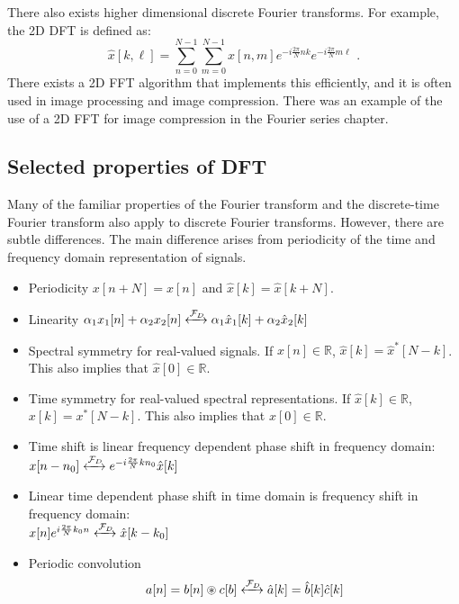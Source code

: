 There also exists higher dimensional discrete Fourier transforms. For example, the 2D DFT is defined as:
\begin{equation}
  \hat{x}[k,\ell] = \sum_{n=0}^{N-1}\sum_{m=0}^{N-1} x[n,m] e^{-i \frac{2\pi}{N}nk }e^{-i \frac{2\pi}{N}m\ell } \,\,.
\end{equation}
There exists a 2D FFT algorithm that implements this efficiently, and
it is often used in image processing and image compression. There was
an example of the use of a 2D FFT for image compression in the Fourier
series chapter.


\subsection{Selected properties of DFT}

Many of the familiar properties of the Fourier transform and the
discrete-time Fourier transform also apply to discrete Fourier
transforms. However, there are subtle differences. The main difference
arises from periodicity of the time and frequency domain
representation of signals.
\begin{itemize}
\item Periodicity $x[n+N]=x[n]$ and $\hat{x}[k]=\hat{x}[k+N]$.
\item Linearity $\alpha_1 x_1[n] + \alpha_2x_2[n] \xleftrightarrow{\mathcal{F}_D} \alpha_1 \hat{x}_1[k] + \alpha_2 \hat{x}_2[k]$

\item Spectral symmetry for real-valued signals. If $x[n] \in \mathbb{R}$, $\hat{x}[k]=\hat{x}^*[N-k]$. This also implies that $\hat{x}[0]\in \mathbb{R}$.

\item Time symmetry for real-valued spectral representations. If $\hat{x}[k] \in \mathbb{R}$, $x[k]=x^*[N-k]$. This also implies that $x[0]\in \mathbb{R}$.

\item Time shift is linear frequency dependent phase shift in frequency domain:\\ $x[n-n_0]\xleftrightarrow{\mathcal{F}_D} e^{-i\frac{2\pi}{N}k n_0}\hat{x}[k]$
\item Linear time dependent phase shift in time domain is frequency shift in frequency domain:\\ $x[n]e^{i\frac{2\pi}{N}k_0 n} \xleftrightarrow{\mathcal{F}_D} \hat{x}[k-k_0]$
\item Periodic convolution
\begin{equation}
a[n]=b[n]\circledast c[b]\xleftrightarrow{\mathcal{F}_D} \hat{a}[k]=\hat{b}[k]\hat{c}[k]
\end{equation}
\end{itemize}
\fi 
